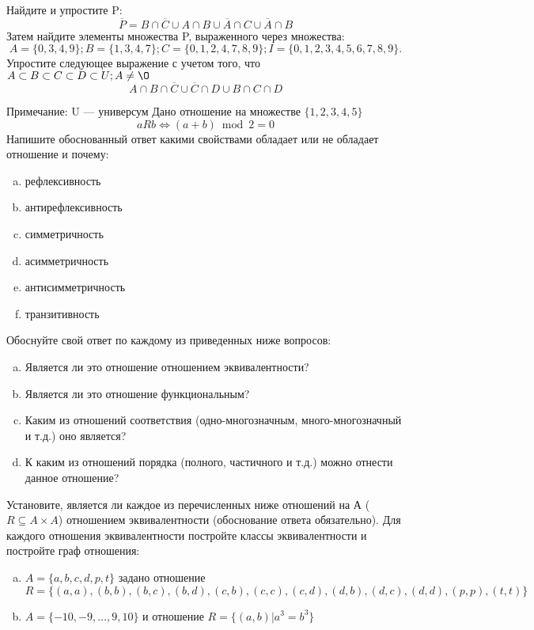 \documentclass[10pt]{exam}
\begin{document}
\begin{questions}
\question
Найдите и упростите P:
\begin{equation*}
\overline{P} = B \cap \overline{C} \cup A \cap B \cup \overline{A} \cap C \cup \overline{A} \cap B
\end{equation*}
Затем найдите элементы множества P, выраженного через множества:
\begin{equation*}
A = \{0, 3, 4, 9\}; 
B = \{1, 3, 4, 7\};
C = \{0, 1, 2, 4, 7, 8, 9\};
I = \{0, 1, 2, 3, 4, 5, 6, 7, 8, 9\}.
\end{equation*}\question
Упростите следующее выражение с учетом того, что $A\subset B \subset C \subset D \subset U; A \neq \O$
\begin{equation*}
A \cap B  \cap \overline{C} \cup \overline{C} \cap D \cup B \cap C \cap D
\end{equation*}

Примечание: U — универсум\question
Дано отношение на множестве $\{1, 2, 3, 4, 5\}$ 
\begin{equation*}
aRb \iff (a+b) \bmod 2 =0
\end{equation*}
Напишите обоснованный ответ какими свойствами обладает или не обладает отношение и почему:   
\begin{enumerate} [a)]\setcounter{enumi}{0}
\item рефлексивность
\item антирефлексивность
\item симметричность
\item асимметричность
\item антисимметричность
\item транзитивность
\end{enumerate}

Обоснуйте свой ответ по каждому из приведенных ниже вопросов:
\begin{enumerate} [a)]\setcounter{enumi}{0}
    \item Является ли это отношение отношением эквивалентности?
    \item Является ли это отношение функциональным?
    \item Каким из отношений соответствия (одно-многозначным, много-многозначный и т.д.) оно является?
    \item К каким из отношений порядка (полного, частичного и т.д.) можно отнести данное отношение?
\end{enumerate}



\question
Установите, является ли каждое из перечисленных ниже отношений на А ($R \subseteq A \times A$) отношением эквивалентности (обоснование ответа обязательно). Для каждого отношения эквивалентности постройте классы 
эквивалентности и постройте граф отношения:
\begin{enumerate} [a)]\setcounter{enumi}{0}
\item $A = \{a, b, c, d, p, t\}$ задано отношение $R = \{(a, a), (b, b), (b, c), (b, d), (c, b), (c, c), (c, d), (d, b), (d, c), (d, d), (p,p), (t,t)\}$
\item $A = \{-10, -9, … , 9, 10\}$ и отношение $R = \{(a,b)|a^{3} = b^{3}\}$


\end{enumerate}
\end{questions}
\end{document}
